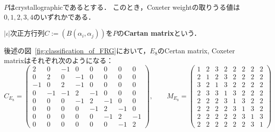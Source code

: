 \begin{lemma}
  \label{lem:RootPairing.coxeterWeightIn_mem_set_of_isCrystallographic}
  \leanok
  $P$はcrystallographicであるとする．
  このとき，Coxeter weightの取りうる値は$0, 1, 2, 3, 4$のいずれかである．
\end{lemma}

\begin{definition}
  \label{defi:RootPairing.Base.cartanMatrixIn}
  \leanok
  $|\iota|$次正方行列$C := (B(\alpha_i, \alpha_j))$を$P$の\textbf{Cartan matrix}という．
\end{definition}

\begin{example}
  後述の図~\ref{fig:classification_of_FRG}において，$E_8$のCertan matrix, Coxeter matrixはそれぞれ次のようになる：
  \begin{equation}
    C_{E_8} =
    \begin{pmatrix}
      2 & 0 & -1 & 0 & 0 & 0 & 0 & 0 \\
      0 & 2 & 0 & -1 & 0 & 0 & 0 & 0 \\
      -1 & 0 & 2 & -1 & 0 & 0 & 0 & 0 \\
      0 & -1 & -1 & 2 & -1 & 0 & 0 & 0 \\
      0 & 0 & 0 & -1 & 2 & -1 & 0 & 0 \\
      0 & 0 & 0 & 0 & -1 & 2 & -1 & 0 \\
      0 & 0 & 0 & 0 & 0 & -1 & 2 & -1 \\
      0 & 0 & 0 & 0 & 0 & 0 & -1 & 2
    \end{pmatrix},\qquad
    M_{E_8} =
    \begin{pmatrix}
      1 & 2 & 3 & 2 & 2 & 2 & 2 & 2 \\
      2 & 1 & 2 & 3 & 2 & 2 & 2 & 2 \\
      3 & 2 & 1 & 3 & 2 & 2 & 2 & 2 \\
      2 & 3 & 3 & 1 & 3 & 2 & 2 & 2 \\
      2 & 2 & 2 & 3 & 1 & 3 & 2 & 2 \\
      2 & 2 & 2 & 2 & 3 & 1 & 3 & 2 \\
      2 & 2 & 2 & 2 & 2 & 3 & 1 & 3 \\
      2 & 2 & 2 & 2 & 2 & 2 & 3 & 1
    \end{pmatrix}
  \end{equation}
\end{example}

